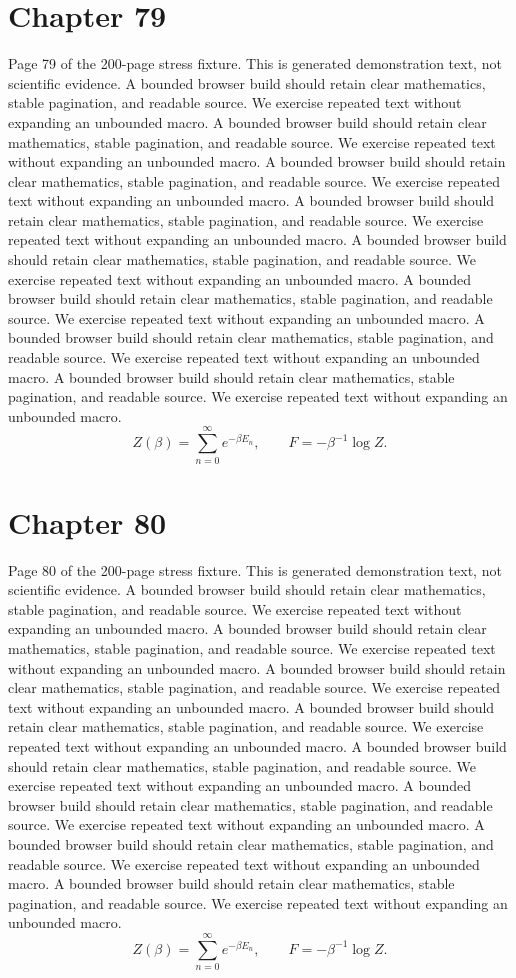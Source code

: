 \documentclass[11pt]{article}
\begin{document}
\section*{Chapter 79}
Page 79 of the 200-page stress fixture. This is generated demonstration text, not scientific evidence.
A bounded browser build should retain clear mathematics, stable pagination, and readable source. We exercise repeated text without expanding an unbounded macro.
A bounded browser build should retain clear mathematics, stable pagination, and readable source. We exercise repeated text without expanding an unbounded macro.
A bounded browser build should retain clear mathematics, stable pagination, and readable source. We exercise repeated text without expanding an unbounded macro.
A bounded browser build should retain clear mathematics, stable pagination, and readable source. We exercise repeated text without expanding an unbounded macro.
A bounded browser build should retain clear mathematics, stable pagination, and readable source. We exercise repeated text without expanding an unbounded macro.
A bounded browser build should retain clear mathematics, stable pagination, and readable source. We exercise repeated text without expanding an unbounded macro.
A bounded browser build should retain clear mathematics, stable pagination, and readable source. We exercise repeated text without expanding an unbounded macro.
A bounded browser build should retain clear mathematics, stable pagination, and readable source. We exercise repeated text without expanding an unbounded macro.
\[Z(\beta)=\sum_{n=0}^{\infty}e^{-\beta E_n},\qquad F=-\beta^{-1}\log Z.\]
\newpage
\section*{Chapter 80}
Page 80 of the 200-page stress fixture. This is generated demonstration text, not scientific evidence.
A bounded browser build should retain clear mathematics, stable pagination, and readable source. We exercise repeated text without expanding an unbounded macro.
A bounded browser build should retain clear mathematics, stable pagination, and readable source. We exercise repeated text without expanding an unbounded macro.
A bounded browser build should retain clear mathematics, stable pagination, and readable source. We exercise repeated text without expanding an unbounded macro.
A bounded browser build should retain clear mathematics, stable pagination, and readable source. We exercise repeated text without expanding an unbounded macro.
A bounded browser build should retain clear mathematics, stable pagination, and readable source. We exercise repeated text without expanding an unbounded macro.
A bounded browser build should retain clear mathematics, stable pagination, and readable source. We exercise repeated text without expanding an unbounded macro.
A bounded browser build should retain clear mathematics, stable pagination, and readable source. We exercise repeated text without expanding an unbounded macro.
A bounded browser build should retain clear mathematics, stable pagination, and readable source. We exercise repeated text without expanding an unbounded macro.
\[Z(\beta)=\sum_{n=0}^{\infty}e^{-\beta E_n},\qquad F=-\beta^{-1}\log Z.\]
\newpage
\end{document}
